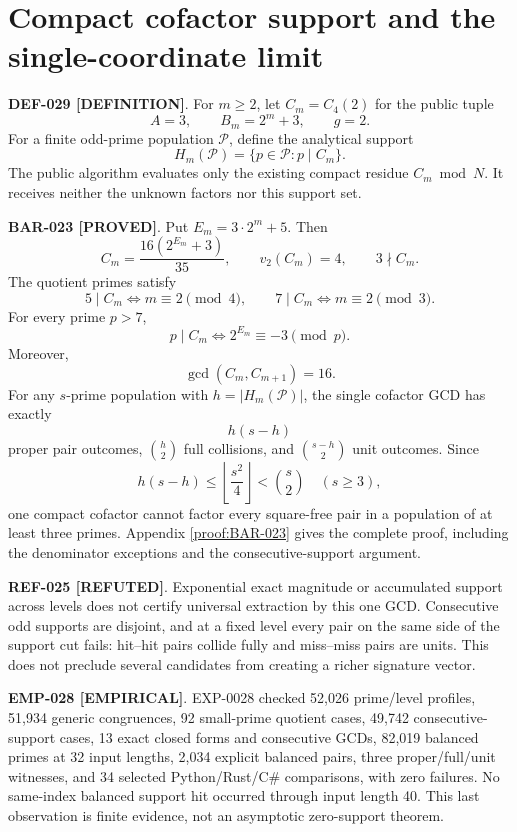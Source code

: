 \documentclass[11pt]{article}
\newcommand{\claimstatus}[2]{\textbf{#1 [#2]}}
\begin{document}
\section{Compact cofactor support and the single-coordinate limit}

\claimstatus{DEF-029}{DEFINITION}. For \(m\ge2\), let \(C_m=C_4(2)\) for
the public tuple
\[
A=3,\qquad B_m=2^m+3,\qquad g=2.
\]
For a finite odd-prime population \(\mathcal P\), define the analytical
support
\[
H_m(\mathcal P)=\{p\in\mathcal P:p\mid C_m\}.
\]
The public algorithm evaluates only the existing compact residue
\(C_m\bmod N\). It receives neither the unknown factors nor this support
set.

\claimstatus{BAR-023}{PROVED}. Put \(E_m=3\cdot2^m+5\). Then
\[
C_m=\frac{16(2^{E_m}+3)}{35},\qquad
v_2(C_m)=4,\qquad 3\nmid C_m.
\]
The quotient primes satisfy
\[
5\mid C_m\Longleftrightarrow m\equiv2\pmod4,\qquad
7\mid C_m\Longleftrightarrow m\equiv2\pmod3.
\]
For every prime \(p>7\),
\[
p\mid C_m\Longleftrightarrow2^{E_m}\equiv-3\pmod p.
\]
Moreover,
\[
\gcd(C_m,C_{m+1})=16.
\]
For any \(s\)-prime population with \(h=|H_m(\mathcal P)|\), the single
cofactor GCD has exactly
\[
h(s-h)
\]
proper pair outcomes, \(\binom h2\) full collisions, and
\(\binom{s-h}{2}\) unit outcomes. Since
\[
h(s-h)\le\left\lfloor\frac{s^2}{4}\right\rfloor
<\binom{s}{2}\quad(s\ge3),
\]
one compact cofactor cannot factor every square-free pair in a population of
at least three primes. Appendix \ref{proof:BAR-023} gives the complete proof,
including the denominator exceptions and the consecutive-support argument.

\claimstatus{REF-025}{REFUTED}. Exponential exact magnitude or accumulated
support across levels does not certify universal extraction by this one GCD.
Consecutive odd supports are disjoint, and at a fixed level every pair on
the same side of the support cut fails: hit--hit pairs collide fully and
miss--miss pairs are units. This does not preclude several candidates from
creating a richer signature vector.

\claimstatus{EMP-028}{EMPIRICAL}. EXP-0028 checked 52,026 prime/level
profiles, 51,934 generic congruences, 92 small-prime quotient cases, 49,742
consecutive-support cases, 13 exact closed forms and consecutive GCDs,
82,019 balanced primes at 32 input lengths, 2,034 explicit balanced pairs,
three proper/full/unit witnesses, and 34 selected Python/Rust/C\#
comparisons, with zero failures. No same-index balanced support hit occurred
through input length 40. This last observation is finite evidence, not an
asymptotic zero-support theorem.
\end{document}
